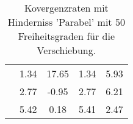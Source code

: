 \begin{table}
\begin{tabular}{c|cc|cc|}
\multicolumn{1}{|c|}{} & \multicolumn{1}{|c|}{      1.34} & \multicolumn{1}{|c|}{     17.65} & \multicolumn{1}{|c|}{      1.34} & \multicolumn{1}{|c|}{      5.93} \\ 
\multicolumn{1}{|c|}{} & \multicolumn{1}{|c|}{      2.77} & \multicolumn{1}{|c|}{     -0.95} & \multicolumn{1}{|c|}{      2.77} & \multicolumn{1}{|c|}{      6.21} \\ 
\multicolumn{1}{|c|}{} & \multicolumn{1}{|c|}{      5.42} & \multicolumn{1}{|c|}{      0.18} & \multicolumn{1}{|c|}{      5.41} & \multicolumn{1}{|c|}{      2.47} \\ 
\hline 
\end{tabular}\caption{Kovergenzraten mit Hinderniss 'Parabel' mit 50 Freiheitsgraden für die Verschiebung.}\label{tab:Rate_Parabel_level1}
\end{table} 
